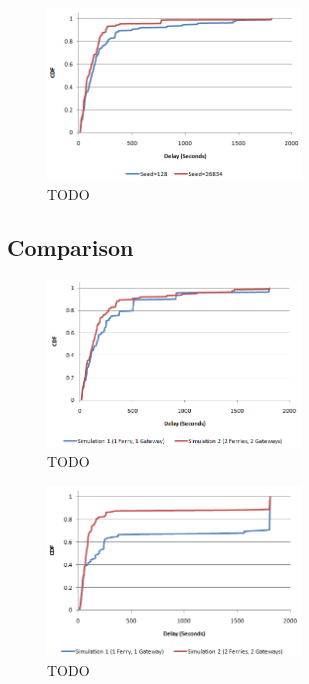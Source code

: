 \begin{figure}[ht]
    \centering
    \includegraphics[width=0.6\textwidth]{images/result_delay_sim2byseed_mc30}
    \caption{TODO}
\end{figure}


\subsection{Comparison}

\begin{figure}[ht]
    \centering
    \includegraphics[width=0.6\textwidth]{images/result_delay_both_128_mc30}
    \caption{TODO}
\end{figure}


\begin{figure}[ht]
    \centering
    \includegraphics[width=0.6\textwidth]{images/result_delay_both_128_mc5}
    \caption{TODO}
\end{figure}